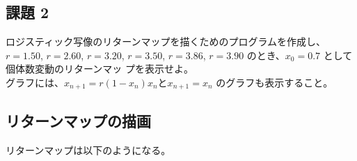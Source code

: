 \documentclass[a4j]{jsarticle}
\begin{document}
\newpage

\subsection{課題 2}
 ロジスティック写像のリターンマップを描くためのプログラムを作成し、$r = 1.50$, $r = 2.60$, $r = 3.20$, $r = 3.50$, $r = 3.86$, $r = 3.90$ のとき、$x_{0} = 0.7$ として個体数変動のリターンマッ プを表示せよ。\\
 グラフには、$x_{n+1} = r(1 − x_{n})x_{n} と x_{n+1} = x_{n}$ のグラフも表示すること。\\

\subsection{リターンマップの描画}

リターンマップは以下のようになる。
\end{document}
